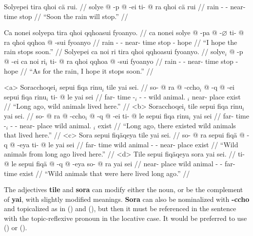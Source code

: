 \documentclass{article}
\begin{document}
\ex[lingstyle=QuCheanya] \begingl
\glpreamble Solyepei tira qhoi c\"a rui. //
\gla solye @ -p @ -ei ti- @ ra qhoi c\"a rui //
\glb rain - - near- time stop   //
\glft ``Soon the rain will stop.'' //
\endgl \xe

\pex[lingstyle=QuCheanya] 
\a \begingl
\glpreamble Ca nonei solyepa tira qhoi qqhoasui fyoanyo. //
\gla ca nonei solye @ -pa @ -$\varnothing$ ti- @ ra qhoi qqhoa @ -sui fyoanyo //
\glb {}  rain - - near- time stop  - hope //
\glft ``I hope the rain stops soon.'' //
\endgl
\a \begingl
\glpreamble Solyepei ca noi ri tira qhoi qqhoasui fyoanyo. //
\gla solye$_i$ @ -p @ -ei ca noi ri$_i$ ti- @ ra qhoi qqhoa @ -sui fyoanyo //
\glb rain - -    near- time stop  - hope //
\glft ``As for the rain, I hope it stops soon.'' //
\endgl \xe

\pex[lingstyle=QuCheanya,tag=animals] 
\a<a> \begingl
\glpreamble Soracchoqei$_i$ sepui fiqa rinu$_i$ tile yai sei. //
\gla so- @ ra @ -ccho$_i$ @ -q @ -ei sepui fiqa rinu$_i$ ti- @ le yai sei //
\glb far- time -$_i$ - - wild animal. $_i$ near- place exist  //
\glft ``Long ago, wild animals lived here.'' //
\endgl 
\a<b> \begingl
\glpreamble Soracchoqei$_i$ tile sepui fiqa rinu$_i$ yai sei. //
\gla so- @ ra @ -ccho$_i$ @ -q @ -ei ti- @ le sepui fiqa rinu$_i$ yai sei //
\glb far- time -$_i$ - - near- place wild animal. $_i$ exist  //
\glft ``Long ago, there existed wild animals that lived here.'' //
\endgl
\a<c> \begingl
\glpreamble Sora sepui fiq\"aqeya tile yai sei. //
\gla so- @ ra sepui fiq\"a @ -q @ -eya ti- @ le yai sei //
\glb far- time wild animal - - near- place exist  //
\glft ``Wild animals from long ago lived here.'' //
\endgl
\a<d> \begingl
\glpreamble Tile sepui fiq\"aqeya sora yai sei. //
\gla ti- @ le sepui fiq\"a @ -q @ -eya so- @ ra yai sei //
\glb near- place wild animal - - far- time exist  //
\glft ``Wild animals that were here lived long ago.'' //
\endgl
\xe

The adjectives \textbf{tile} and \textbf{sora} can modify either the noun, or be the complement of \textbf{yai}, with slightly modified meanings.  \textbf{Sora} can also be nominalized with \textbf{-ccho} and topicalized as in () and (), but then it must be referenced in the sentence with the topic-reflexive pronoun in the locative case. It would be preferred to use () or ().
\end{document}
